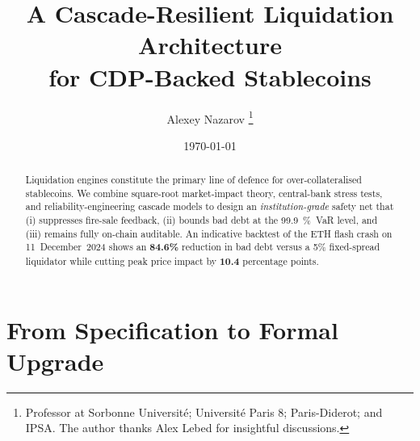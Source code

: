 \documentclass[11pt]{article}
\title{\bfseries
A Cascade-Resilient Liquidation Architecture\\[-2pt]
for CDP-Backed Stablecoins}
\author{Alexey Nazarov%
  \thanks{Professor at Sorbonne Université; Université Paris 8; Paris-Diderot; and IPSA. The author thanks Alex Lebed for insightful discussions.}
}
\date{\today}
\begin{document}
\maketitle

\begin{abstract}
Liquidation engines constitute the primary line of defence for over-collateralised
stablecoins. We combine square-root market-impact theory, central-bank stress
tests, and reliability-engineering cascade models to design an \emph{institution-grade}
safety net that (i) suppresses fire-sale feedback, (ii) bounds bad debt at the
\SI{99.9}{\percent}~VaR level, and (iii) remains fully on-chain auditable.
An indicative backtest of the ETH flash crash on 11~December~2024 shows an
\textbf{84.6\%} reduction in bad debt versus a \textsc{5\%} fixed-spread
liquidator while cutting peak price impact by \textbf{10.4} percentage points.
\end{abstract}

\clearpage
{}
\tableofcontents
\clearpage


\section{From Specification to Formal Upgrade}
\end{document}
